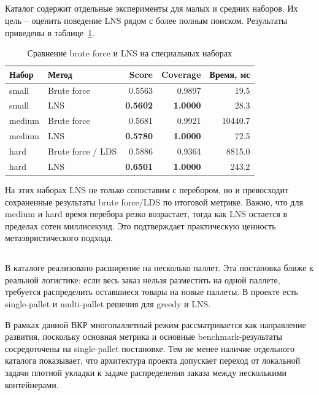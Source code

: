 \subsection{}

Каталог  содержит отдельные эксперименты для малых и средних наборов. Их цель -- оценить поведение LNS рядом с более полным поиском. Результаты приведены в таблице~\ref{tab:brute}.

\begin{table}[H]
\caption{Сравнение brute force и LNS на специальных наборах}
\label{tab:brute}
\centering
\small
\begin{tabular}{|l|l|r|r|r|}
\hline
\textbf{Набор} & \textbf{Метод} & \textbf{Score} & \textbf{Coverage} & \textbf{Время, мс} \\
\hline
small & Brute force & 0.5563 & 0.9897 & 19.5 \\ \hline
small & LNS & \textbf{0.5602} & \textbf{1.0000} & 28.3 \\ \hline
medium & Brute force & 0.5681 & 0.9921 & 10440.7 \\ \hline
medium & LNS & \textbf{0.5780} & \textbf{1.0000} & 72.5 \\ \hline
hard & Brute force / LDS & 0.5886 & 0.9364 & 8815.0 \\ \hline
hard & LNS & \textbf{0.6501} & \textbf{1.0000} & 243.2 \\ \hline
\end{tabular}
\end{table}

На этих наборах LNS не только сопоставим с перебором, но и превосходит сохраненные результаты brute force/LDS по итоговой метрике. Важно, что для medium и hard время перебора резко возрастает, тогда как LNS остается в пределах сотен миллисекунд. Это подтверждает практическую ценность метаэвристического подхода.

\subsection{}

В каталоге  реализовано расширение на несколько паллет. Эта постановка ближе к реальной логистике: если весь заказ нельзя разместить на одной паллете, требуется распределить оставшиеся товары на новые паллеты. В проекте есть single-pallet и multi-pallet решения для greedy и LNS.

В рамках данной ВКР многопаллетный режим рассматривается как направление развития, поскольку основная метрика и основные benchmark-результаты сосредоточены на single-pallet постановке. Тем не менее наличие отдельного каталога  показывает, что архитектура проекта допускает переход от локальной задачи плотной укладки к задаче распределения заказа между несколькими контейнерами.

